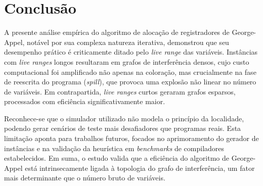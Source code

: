 \section{Conclusão}

A presente análise empírica do algoritmo de alocação de registradores de George-Appel, notável por sua complexa natureza iterativa, demonstrou que seu desempenho
prático é criticamente ditado pelo \textit{live range} das variáveis. Instâncias com \textit{live ranges} longos resultaram em grafos de interferência densos,
cujo custo computacional foi amplificado não apenas na coloração, mas crucialmente na fase de reescrita do programa (\textit{spill}), que provoca uma explosão
não linear no número de variáveis. Em contrapartida, \textit{live ranges} curtos geraram grafos esparsos, processados com eficiência significativamente maior.

Reconhece-se que o simulador utilizado não modela o princípio da localidade, podendo gerar cenários de teste mais desafiadores que programas reais. Esta
limitação aponta para trabalhos futuros, focados no aprimoramento do gerador de instâncias e na validação da heurística em \textit{benchmarks} de compiladores
estabelecidos. Em suma, o estudo valida que a eficiência do algoritmo de George-Appel está intrinsecamente ligada à topologia do grafo de interferência, um fator
mais determinante que o número bruto de variáveis.
